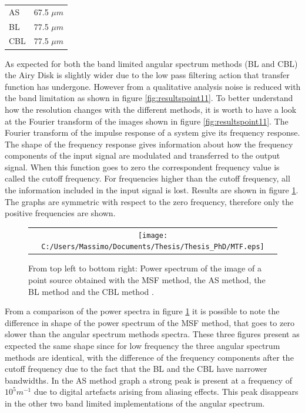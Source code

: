 	 \begin {table}
	 \begin{center}
	 \begin{tabular}{ l | r }
	 	
	 	\hline			
	 	AS & 67.5 $\mu m$ \\
	 	BL & 77.5 $\mu m$ \\
	 	CBL & 77.5 $\mu m$ \\
	 	\hline 
	 		\end{tabular}
	\end{center}
\end{table}
	As expected for both the band limited angular spectrum methods (BL and CBL) the Airy Disk is slightly wider due to the low pass filtering action that transfer function has undergone. However from a qualitative analysis noise is reduced with the band limitation as shown in figure
	 \ref{fig:resultspoint11}.
	 To better understand how the resolution changes with the different methods, it is worth to have a look at the Fourier transform of the images shown in figure \ref{fig:resultspoint11}. The Fourier transform of the impulse response of a system give its frequency response. The shape of the frequency response gives information about how the frequency components of the input signal are modulated and transferred to the output signal. When this function goes to zero the correspondent frequency value is called the cutoff frequency. For frequencies higher than the cutoff frequency, all the information included in the input signal is lost. Results are shown in figure \ref{fig:resultspoint2}. The graphs are symmetric with respect to the zero frequency, therefore only the positive frequencies are shown.
	 
	 \begin{figure}[h]
	 	\begin{center}
	 		\begin{tabular}{c}
	 			\texttt{[image: C:/Users/Massimo/Documents/Thesis/Thesis\_PhD/MTF.eps]}
	 		\end{tabular}
	 	\end{center}
	 	\caption{ \label{fig:resultspoint2} 
	 		From top left to bottom right: Power spectrum of the image of a point source obtained with the MSF method, the AS method, the BL method and the CBL method . }
	 \end{figure} 
	From a comparison of the power spectra in figure \ref{fig:resultspoint2} it is possible to note the difference in shape of the power spectrum of the MSF method, that goes to zero slower than the angular spectrum methods spectra. These three figures present as expected the same shape since for low frequency the three angular spectrum methods are identical, with the difference of the frequency components after the cutoff frequency due to the fact that the BL and the CBL have narrower bandwidths. In the AS method graph a strong peak is present at a frequency of $10^5 m^{-1}$ due to digital artefacts arising from aliasing effects. This peak disappears in the other two band limited implementations of the angular spectrum. 
